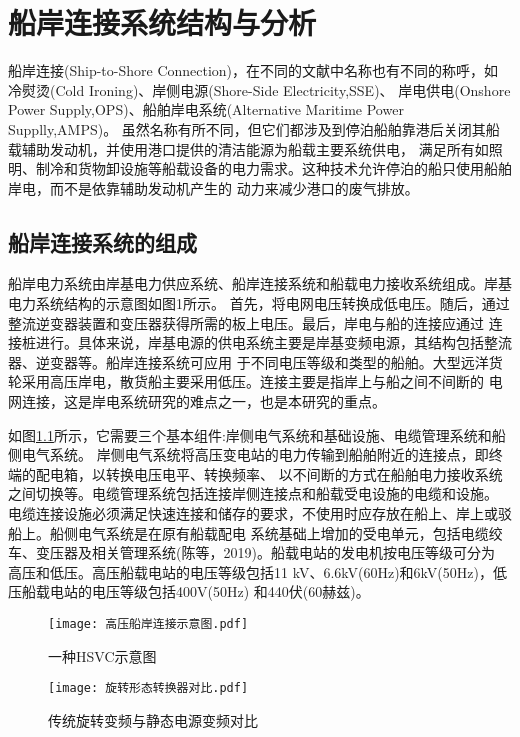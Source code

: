 \chapter{船岸连接系统结构与分析}

船岸连接(Ship-to-Shore Connection)，在不同的文献中名称也有不同的称呼，如冷熨烫(Cold Ironing)、岸侧电源(Shore-Side Electricity,SSE)、
岸电供电(Onshore Power Supply,OPS)、船舶岸电系统(Alternative Maritime Power Supplly,AMPS)。
虽然名称有所不同，但它们都涉及到停泊船舶靠港后关闭其船载辅助发动机，并使用港口提供的清洁能源为船载主要系统供电，
满足所有如照明、制冷和货物卸设施等船载设备的电力需求。这种技术允许停泊的船只使用船舶岸电，而不是依靠辅助发动机产生的
动力来减少港口的废气排放。

\section{船岸连接系统的组成}


船岸电力系统由岸基电力供应系统、船岸连接系统和船载电力接收系统组成。岸基电力系统结构的示意图如图1所示。
首先，将电网电压转换成低电压。随后，通过整流逆变器装置和变压器获得所需的板上电压。最后，岸电与船的连接应通过
连接桩进行。具体来说，岸基电源的供电系统主要是岸基变频电源，其结构包括整流器、逆变器等。船岸连接系统可应用
于不同电压等级和类型的船舶。大型远洋货轮采用高压岸电，散货船主要采用低压。连接主要是指岸上与船之间不间断的
电网连接，这是岸电系统研究的难点之一，也是本研究的重点。

如图\ref{fig:一种HSVC示意图}所示，它需要三个基本组件:岸侧电气系统和基础设施、电缆管理系统和船侧电气系统。
岸侧电气系统将高压变电站的电力传输到船舶附近的连接点，即终端的配电箱，以转换电压电平、转换频率、
以不间断的方式在船舶电力接收系统之间切换等。电缆管理系统包括连接岸侧连接点和船载受电设施的电缆和设施。
电缆连接设施必须满足快速连接和储存的要求，不使用时应存放在船上、岸上或驳船上。船侧电气系统是在原有船载配电
系统基础上增加的受电单元，包括电缆绞车、变压器及相关管理系统(陈等，2019)。船载电站的发电机按电压等级可分为
高压和低压。高压船载电站的电压等级包括11 kV、6.6kV(60Hz)和6kV(50Hz)，低压船载电站的电压等级包括400V(50Hz)
和440伏(60赫兹)。

\begin{figure}[!htp]
	\centering
	\texttt{[image: 高压船岸连接示意图.pdf]}
	\caption{一种HSVC示意图}
	\label{fig:一种HSVC示意图}
\end{figure}

\begin{figure}[!htp]
	\centering
	\texttt{[image: 旋转形态转换器对比.pdf]}
	\caption{传统旋转变频与静态电源变频对比}
	\label{fig:传统旋转变频与静态电源变频对比}
\end{figure}

